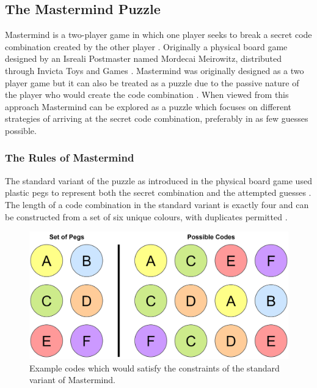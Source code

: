 \documentclass[11pt]{article}  %
\theoremstyle{definition}
\theoremstyle{remark}
\begin{document}
\subsection {The Mastermind Puzzle}

Mastermind is a two-player game in which one player seeks to break a secret code combination created by the other player \cite{Wolfram}. Originally a physical board game designed by an Isreali Postmaster named Mordecai Meirowitz, distributed through Invicta Toys and Games \cite{Invicta}. Mastermind was originally designed as a two player game but it can also be treated as a puzzle due to the passive nature of the player who would create the code combination \cite {Better Solutions}. When viewed from this approach Mastermind can be explored as a puzzle which focuses on different strategies of arriving at the secret code combination, preferably in as few guesses possible.

\subsubsection {The Rules of Mastermind}

The standard variant of the puzzle as introduced in the physical board game used plastic pegs to represent both the secret combination and the attempted guesses \cite {Invicta}.
The length of a code combination in the standard variant is exactly four and can be constructed from a set of six unique colours, with duplicates permitted \cite{Wolfram}.

\begin{figure}[H]
\centering
\includegraphics[scale=0.5]{pegs}
\caption{ Example codes which would satisfy the constraints of the standard variant of Mastermind.}
\end{figure}
\end{document}

